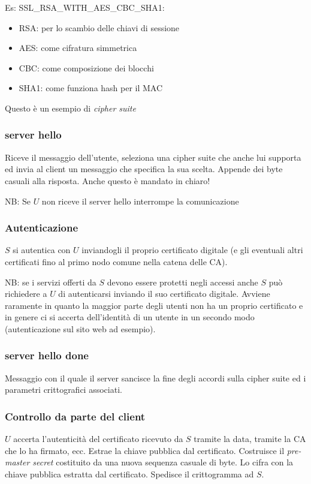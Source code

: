Es: SSL\_RSA\_WITH\_AES\_CBC\_SHA1:
\begin{itemize}
    \item RSA: per lo scambio delle chiavi di sessione
    \item AES: come cifratura simmetrica
    \item CBC: come composizione dei blocchi
    \item SHA1: come funziona hash per il MAC
\end{itemize}
Questo è un esempio di \emph{cipher suite}

\subsubsection{server hello}
Riceve il messaggio dell'utente, seleziona una cipher suite che anche lui supporta ed invia al client un messaggio che specifica la sua scelta. Appende dei byte casuali alla risposta. Anche questo è mandato in chiaro!

NB: Se $U$ non riceve il server hello interrompe la comunicazione

\subsubsection{Autenticazione}
$S$ si autentica con $U$ inviandogli il proprio certificato digitale (e gli eventuali altri certificati fino al primo nodo comune nella catena delle CA).

NB: se i servizi offerti da $S$ devono essere protetti negli accessi anche $S$ può richiedere a $U$ di autenticarsi inviando il suo certificato digitale. Avviene raramente in quanto la maggior parte degli utenti non ha un proprio certificato e in genere ci si accerta dell'identità di un utente in un secondo modo (autenticazione sul sito web ad esempio).

\subsubsection{server hello done}
Messaggio con il quale il server sancisce la fine degli accordi sulla cipher suite ed i parametri crittografici associati.

\subsubsection{Controllo da parte del client}
$U$ accerta l'autenticità del certificato ricevuto da $S$ tramite la data, tramite la CA che lo ha firmato, ecc. Estrae la chiave pubblica dal certificato. Costruisce il \emph{pre-master secret} costituito da una nuova sequenza casuale di byte. Lo cifra con la chiave pubblica estratta dal certificato. Spedisce il crittogramma ad $S$.

